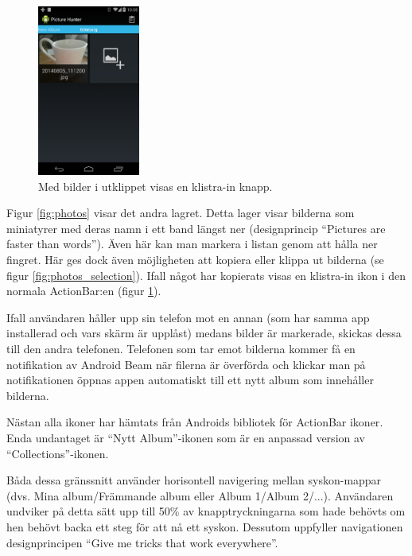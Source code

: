 \documentclass[11px, a4paper, twocolumn]{article}
\begin{document}
	\begin{figure}[p]
		\centering
	    \includegraphics[width=0.3\textwidth]{img/photos_paste}
		\caption{\label{fig:photos_paste}Med bilder i utklippet visas en klistra-in knapp.}
	\end{figure}

	Figur \ref{fig:photos} visar det andra lagret. Detta lager visar bilderna som miniatyrer med deras namn i ett band längst ner (designprincip ``Pictures are faster than words''\cite{Principles}). Även här kan man markera i listan genom att hålla ner fingret. Här ges dock även möjligheten att kopiera eller klippa ut bilderna (se figur \ref{fig:photos_selection}). Ifall något har kopierats visas en klistra-in ikon i den normala ActionBar:en (figur \ref{fig:photos_paste}).

	Ifall användaren håller upp sin telefon mot en annan (som har samma app installerad och vars skärm är upplåst) medans bilder är markerade, skickas dessa till den andra telefonen. Telefonen som tar emot bilderna kommer få en notifikation av Android Beam när filerna är överförda och klickar man på notifikationen öppnas appen automatiskt till ett nytt album som innehåller bilderna.

	Nästan alla ikoner har hämtats från Androids bibliotek för ActionBar ikoner\cite{Icons}. Enda undantaget är ``Nytt Album''-ikonen som är en anpassad version av ``Collections''-ikonen.

	Båda dessa gränssnitt använder horisontell navigering mellan syskon-mappar (dvs. Mina album/Främmande album eller Album 1/Album 2/...). Användaren undviker på detta sätt upp till 50\% av knapptryckningarna som hade behövts om hen behövt backa ett steg för att nå ett syskon. Dessutom uppfyller navigationen designprincipen ``Give me tricks that work everywhere''\cite{Principles}.
\end{document}
